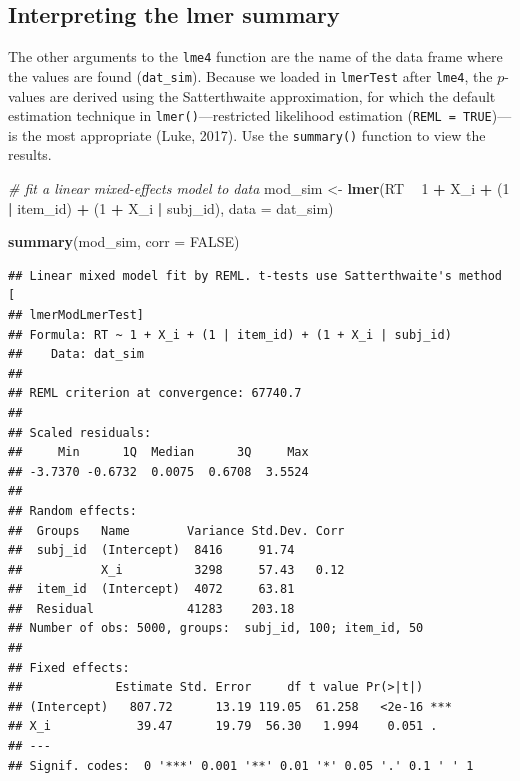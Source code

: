 \documentclass[english,doc,floatsintext]{apa6}
\newenvironment{Shaded}{\begin{snugshade}}{\end{snugshade}}
\newcommand{\CommentTok}[1]{\textcolor[rgb]{0.56,0.35,0.01}{\textit{#1}}}
\newcommand{\DataTypeTok}[1]{\textcolor[rgb]{0.13,0.29,0.53}{#1}}
\newcommand{\DecValTok}[1]{\textcolor[rgb]{0.00,0.00,0.81}{#1}}
\newcommand{\KeywordTok}[1]{\textcolor[rgb]{0.13,0.29,0.53}{\textbf{#1}}}
\newcommand{\NormalTok}[1]{#1}
\newcommand{\OperatorTok}[1]{\textcolor[rgb]{0.81,0.36,0.00}{\textbf{#1}}}
\newcommand{\OtherTok}[1]{\textcolor[rgb]{0.56,0.35,0.01}{#1}}
\newcommand{\StringTok}[1]{\textcolor[rgb]{0.31,0.60,0.02}{#1}}
\begin{document}
\hypertarget{interpreting-the-lmer-summary}{%
\subsection{Interpreting the lmer summary}\label{interpreting-the-lmer-summary}}

The other arguments to the \texttt{lme4} function are the name of the data frame where the values are found (\texttt{dat\_sim}). Because we loaded in \texttt{lmerTest} after \texttt{lme4}, the \(p\)-values are derived using the Satterthwaite approximation, for which the default estimation technique in \texttt{lmer()}---restricted likelihood estimation (\texttt{REML\ =\ TRUE})---is the most appropriate (Luke, 2017). Use the \texttt{summary()} function to view the results.

\begin{Shaded}
\begin{Highlighting}[]
\CommentTok{# fit a linear mixed-effects model to data}
\NormalTok{mod_sim <-}\StringTok{ }\KeywordTok{lmer}\NormalTok{(RT }\OperatorTok{~}\StringTok{ }\DecValTok{1} \OperatorTok{+}\StringTok{ }\NormalTok{X_i }\OperatorTok{+}\StringTok{ }\NormalTok{(}\DecValTok{1} \OperatorTok{|}\StringTok{ }\NormalTok{item_id) }\OperatorTok{+}\StringTok{ }\NormalTok{(}\DecValTok{1} \OperatorTok{+}\StringTok{ }\NormalTok{X_i }\OperatorTok{|}\StringTok{ }\NormalTok{subj_id),}
                \DataTypeTok{data =}\NormalTok{ dat_sim)}

\KeywordTok{summary}\NormalTok{(mod_sim, }\DataTypeTok{corr =} \OtherTok{FALSE}\NormalTok{)}
\end{Highlighting}
\end{Shaded}

\begin{verbatim}
## Linear mixed model fit by REML. t-tests use Satterthwaite's method [
## lmerModLmerTest]
## Formula: RT ~ 1 + X_i + (1 | item_id) + (1 + X_i | subj_id)
##    Data: dat_sim
## 
## REML criterion at convergence: 67740.7
## 
## Scaled residuals: 
##     Min      1Q  Median      3Q     Max 
## -3.7370 -0.6732  0.0075  0.6708  3.5524 
## 
## Random effects:
##  Groups   Name        Variance Std.Dev. Corr
##  subj_id  (Intercept)  8416     91.74       
##           X_i          3298     57.43   0.12
##  item_id  (Intercept)  4072     63.81       
##  Residual             41283    203.18       
## Number of obs: 5000, groups:  subj_id, 100; item_id, 50
## 
## Fixed effects:
##             Estimate Std. Error     df t value Pr(>|t|)    
## (Intercept)   807.72      13.19 119.05  61.258   <2e-16 ***
## X_i            39.47      19.79  56.30   1.994    0.051 .  
## ---
## Signif. codes:  0 '***' 0.001 '**' 0.01 '*' 0.05 '.' 0.1 ' ' 1
\end{verbatim}
\end{document}
